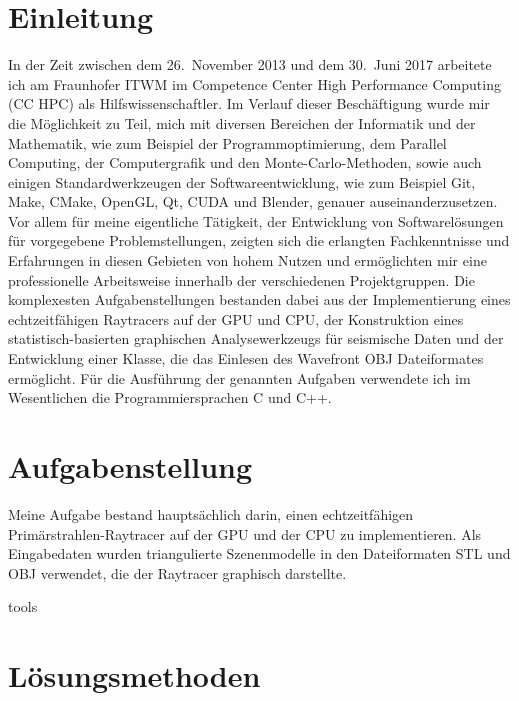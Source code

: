 \documentclass[crop=false]{standalone}
\begin{document}
  \tableofcontents
  \cleardoublepage

  \section{Einleitung} %
  \label{sec:einleitung}

  In der Zeit zwischen dem 26.~November 2013 und dem 30.~Juni 2017 arbeitete ich am Fraunhofer ITWM im Competence Center High Performance Computing (CC HPC) als Hilfswissenschaftler.
  Im Verlauf dieser Beschäftigung wurde mir die Möglichkeit zu Teil, mich mit diversen Bereichen der Informatik und der Mathematik, wie zum Beispiel der Programmoptimierung, dem Parallel Computing, der Computergrafik und den Monte-Carlo-Methoden, sowie auch einigen Standardwerkzeugen der Softwareentwicklung, wie zum Beispiel Git, Make, CMake, OpenGL, Qt, CUDA und Blender, genauer auseinanderzusetzen.
  Vor allem für meine eigentliche Tätigkeit, der Entwicklung von Softwarelösungen für vorgegebene Problemstellungen, zeigten sich die erlangten Fachkenntnisse und Erfahrungen in diesen Gebieten von hohem Nutzen und ermöglichten mir eine professionelle Arbeitsweise innerhalb der verschiedenen Projektgruppen.
  Die komplexesten Aufgabenstellungen bestanden dabei aus der Implementierung eines echtzeitfähigen Raytracers auf der GPU und CPU, der Konstruktion eines statistisch-basierten graphischen Analysewerkzeugs für seismische Daten und der Entwicklung einer Klasse, die das Einlesen des Wavefront OBJ Dateiformates ermöglicht.
  Für die Ausführung der genannten Aufgaben verwendete ich im Wesentlichen die Programmiersprachen C und C++.


  \section{Aufgabenstellung} %
  \label{sec:aufgabenstellung}
    Meine Aufgabe bestand hauptsächlich darin, einen echtzeitfähigen Primärstrahlen-Raytracer auf der GPU und der CPU zu implementieren.
    Als Eingabedaten wurden triangulierte Szenenmodelle in den Dateiformaten STL und OBJ verwendet, die der Raytracer graphisch darstellte.

  {tools}

  \section{Lösungsmethoden} %
  \label{sec:loesungsmethoden}
\end{document}

